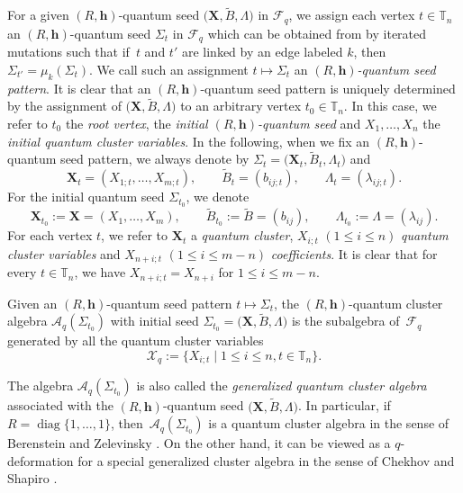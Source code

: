  For a given $(R,\mathbf{h})$-quantum seed $\bigl(\mathbf{X}, \tilde{B}, \Lambda\bigr)$ in $\mathcal{F}_q$, we assign each vertex $t\in \mathbb{T}_n$ an $(R,\mathbf{h})$-quantum seed $\Sigma_t$ in $\mathcal{F}_q$ which can be obtained from  by iterated mutations such that if~$t$ and $t'$ are linked by an edge labeled $k$, then $\Sigma_{t'}=\mu_k(\Sigma_t)$. We call such an assignment $t\mapsto \Sigma_t$ an {\it $(R,\mathbf{h})$-quantum seed pattern}. It is clear that an $(R,\mathbf{h})$-quantum seed pattern is uniquely determined by the assignment of $\bigl(\mathbf{X},\tilde{B}, \Lambda\bigr)$ to an arbitrary vertex $t_0\in \mathbb{T}_n$. In this case, we refer to $t_0$ the {\it root vertex},  the {\it initial $(R,\mathbf{h})$-quantum seed} and $X_1,\dots,X_n$ the {\it initial quantum cluster variables}.
 In the following, when we fix an $(R,\mathbf{h})$-quantum seed pattern, we always denote by $\Sigma_t=\bigl(\mathbf{X}_t,\tilde{B}_t,\Lambda_t\bigr)$ and
\[\mathbf{X}_t=(X_{1;t},\dots,X_{m;t}),\qquad \tilde{B}_t=(b_{ij;t}),\qquad \Lambda_t=(\lambda_{ij;t}).
\]
For the initial quantum seed $\Sigma_{t_0}$, we denote
\[
\mathbf{X}_{t_0}:=\mathbf{X}=(X_1,\dots, X_{m}),\qquad \tilde{B}_{t_0}:=\tilde{B}=(b_{ij}), \qquad\Lambda_{t_0}:=\Lambda=(\lambda_{ij}).
\]
For each vertex $t$, we refer to $\mathbf{X}_t$ a {\it quantum cluster}, $X_{i;t}$ $(1\leq i\leq n)$ {\it quantum cluster variables} and $X_{n+i;t}$ $(1\leq i\leq m-n)$ {\it coefficients}.
It is clear that for every $t\in \mathbb{T}_n$, we have $X_{n+i;t}=X_{n+i}$ for $1\leq i\leq m-n$.
\begin{Definition}
 Given an $(R,\mathbf{h})$-quantum seed pattern $t\mapsto \Sigma_t$, the $(R,\mathbf{h})$-quantum cluster algebra $\mathcal{A}_q(\Sigma_{t_0})$ with initial seed $\Sigma_{t_0}=\bigl(\mathbf{X},\tilde{B},\Lambda\bigr)$ is the  subalgebra of~$\mathcal{F}_q$ generated by all the quantum cluster variables
 \[\mathcal{X}_q:=\{X_{i;t}\mid 1\le i\le n, t\in \mathbb{T}_n\}.\]
\end{Definition}
\begin{Remark}
The algebra $\mathcal{A}_q(\Sigma_{t_0})$ is also called the {\it generalized quantum cluster algebra} associated with the $(R,\mathbf{h})$-quantum seed $\bigl(\mathbf{X},\tilde{B},\Lambda\bigr)$. In particular, if $R=\operatorname{diag}\{1,\dots, 1\}$, then~$\mathcal{A}_q(\Sigma_{t_0})$ is a quantum cluster algebra in the sense of Berenstein and Zelevinsky \cite{Berenstein_Zelevinsky2005}. On the other hand, it can be viewed as a $q$-deformation for a special generalized cluster algebra in the sense of Chekhov and Shapiro \cite{Chekhov_Shapiro}.
\end{Remark}


